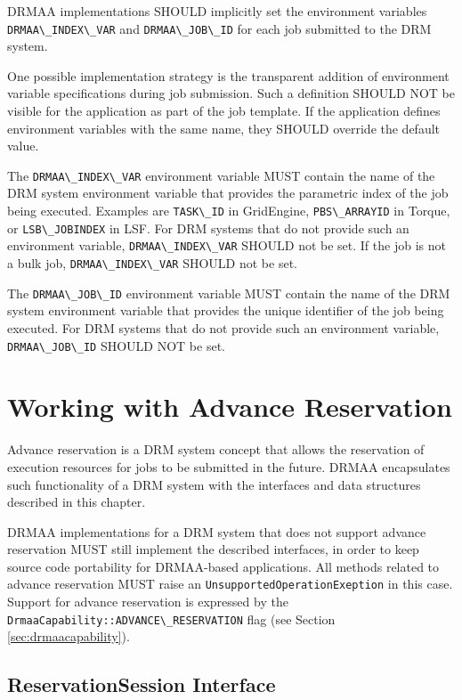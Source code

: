 \documentclass{article}
\newcommand{\h}[1]{\lstinline|#1|}
\newcommand{\rat}[1]{}
\begin{document}
DRMAA implementations SHOULD implicitly set the environment variables \h{DRMAA\_INDEX\_VAR} and \h{DRMAA\_JOB\_ID} for each job submitted to the DRM system.

One possible implementation strategy is the transparent addition of environment variable specifications during job submission. Such a definition SHOULD NOT be visible for the application as part of the job template. If the application defines environment variables with the same name, they SHOULD override the default value.

The \h{DRMAA\_INDEX\_VAR} environment variable MUST contain the name of the DRM system environment variable that provides the parametric index of the job being executed. Examples are \h{TASK\_ID} in GridEngine, \h{PBS\_ARRAYID} in Torque, or \h{LSB\_JOBINDEX} in LSF. For DRM systems that do not provide such an environment variable,  \h{DRMAA\_INDEX\_VAR} SHOULD not be set. If the job is not a bulk job,  \h{DRMAA\_INDEX\_VAR} SHOULD not be set.

The \h{DRMAA\_JOB\_ID} environment variable MUST contain the name of the DRM system environment variable that provides the unique identifier of the job being executed.  For DRM systems that do not provide such an environment variable,  \h{DRMAA\_JOB\_ID} SHOULD NOT be set.

\rat{The Dec. 7th 2011 conf call decided upon the addition of the JOB\_ID environment variable.}

\section{Working with Advance Reservation}

Advance reservation is a DRM system concept that allows the reservation of execution resources for jobs to be submitted in the future. DRMAA encapsulates such functionality of a DRM system with the interfaces and data structures described in this chapter.

DRMAA implementations for a DRM system that does not support advance reservation MUST still implement the described interfaces, in order to keep source code portability for DRMAA-based applications. All methods related to advance reservation MUST raise an \h{UnsupportedOperationExeption} in this case. Support for advance reservation is expressed by the \h{DrmaaCapability::ADVANCE\_RESERVATION} flag (see Section \ref{sec:drmaacapability}). 

\subsection{ReservationSession Interface}
\label{sec:reservationsession}
\end{document}

